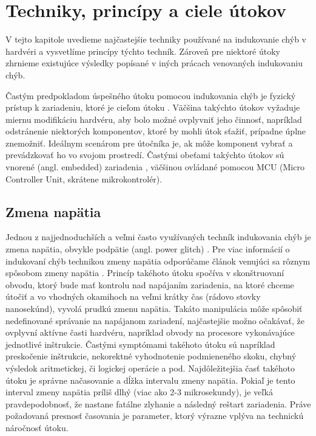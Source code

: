 \chapter{Techniky, princípy a ciele útokov}

\label{kap:teoria}

V tejto kapitole uvedieme najčastejšie techniky používané na indukovanie chýb v hardvéri a vysvetlíme princípy týchto techník. Zároveň pre niektoré útoky zhrnieme existujúce výsledky popísané v iných prácach venovaných indukovaniu chýb.

Častým predpokladom úspešného útoku pomocou indukovania chýb je fyzický prístup k zariadeniu, ktoré je cieľom útoku \cite{lowcost}. Väčšina takýchto útokov vyžaduje miernu modifikáciu hardvéru, aby bolo možné ovplyvniť jeho činnosť, napríklad odstránenie niektorých komponentov, ktoré by mohli útok sťažiť, prípadne úplne znemožniť. Ideálnym scenárom pre útočníka je, ak môže komponent vybrať a prevádzkovať ho vo svojom prostredí. Častými obeťami takýchto útokov sú vnorené (angl. embedded) zariadenia \cite{lowcost}, väčšinou ovládané pomocou MCU (Micro Controller Unit, skrátene mikrokontrolér).

\section{Zmena napätia}
Jednou z najjednoduchších a veľmi často využívaných techník indukovania chýb je zmena napätia, obvykle podpätie (angl. power glitch) \cite{crowbars, vccOnTheCheap, crypto}. Pre viac informácií o indukovaní chýb technikou zmeny napätia odporúčame článok venujúci sa rôznym spôsobom zmeny napätia \cite{powerGlitch}. Princíp takéhoto útoku spočíva v skonštruovaní obvodu, ktorý bude mať kontrolu nad napájaním zariadenia, na ktoré chceme útočiť a vo vhodných okamihoch na veľmi krátky čas (rádovo stovky nanosekúnd), vyvolá prudkú zmenu napätia. Takáto manipulácia môže spôsobiť nedefinované správanie na napájanom zariadení, najčastejšie možno očakávať, že ovplyvní aktívne časti hardvéru, napríklad obvody na procesore vykonávajúce jednotlivé inštrukcie. Častými symptómami takéhoto útoku sú napríklad preskočenie inštrukcie, nekorektné vyhodnotenie podmieneného skoku, chybný výsledok aritmetickej, či logickej operácie a pod. Najdôležitejšia časť takéhoto útoku je správne načasovanie a dĺžka intervalu zmeny napätia. Pokiaľ je tento interval zmeny napätia príliš dlhý (viac ako 2-3 mikrosekundy), je veľká pravdepodobnosť, že nastane fatálne zlyhanie a následný reštart zariadenia. Práve požadovaná presnosť časovania je parameter, ktorý výrazne vplýva na technickú náročnosť útoku.

